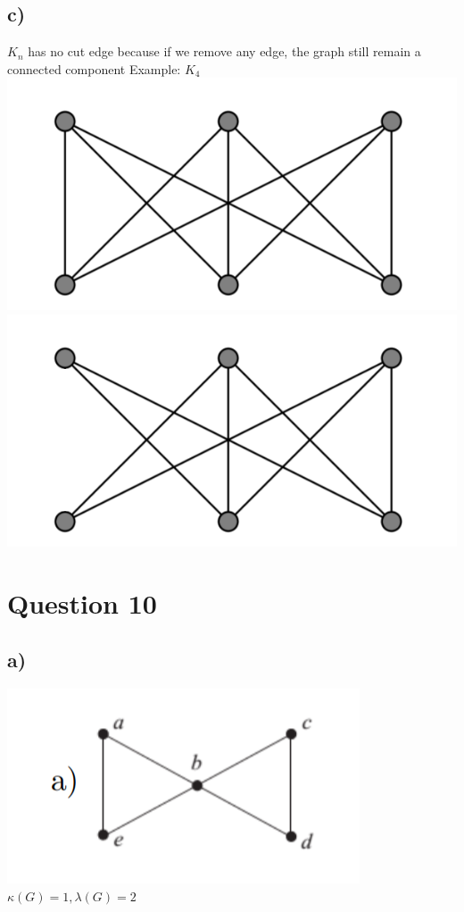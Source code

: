 \documentclass{article}
\begin{document}
\subsection*{c)}
$K_n$ has no cut edge because if we remove any edge, the graph still remain a connected component
Example: $K_4$
\newline
\includegraphics[scale = 0.5]{Question 9/connectivity_9.c.png}
\includegraphics[scale = 0.5]{Question 9/connectivity_9.c.edited.png}
\newline

\section*{Question 10}
\subsection*{a)}
\includegraphics[]{Question 10/connectivity_10.a.png}
\newline
$ \kappa(G) = 1, \lambda(G) = 2 $
\end{document}
